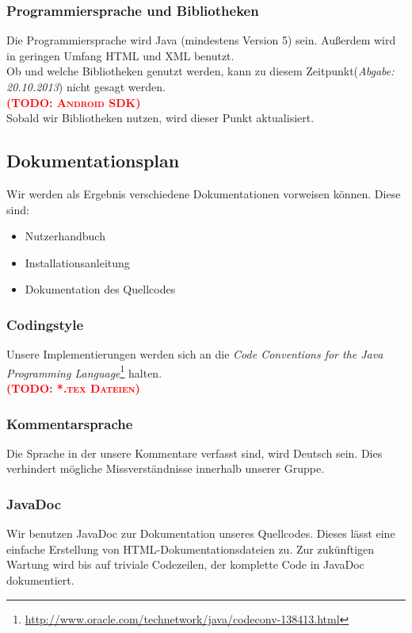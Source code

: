\documentclass[fontsize=12pt,paper=a4,twoside]{scrartcl}
\newcommand{\todo}[1]{\textbf{\textsc{\textcolor{red}{(TODO: #1)}}}}
\begin{document}
\subsubsection{Programmiersprache und Bibliotheken}
Die Programmiersprache wird Java  (mindestens Version 5) sein. Außerdem wird in geringen Umfang HTML und XML benutzt.\\
Ob und welche Bibliotheken genutzt werden, kann zu diesem Zeitpunkt(\emph{Abgabe: 20.10.2013}) nicht gesagt werden.\\
\todo{Android SDK}
\\
Sobald wir Bibliotheken nutzen, wird dieser Punkt aktualisiert.
\subsection{Dokumentationsplan}
Wir werden als Ergebnis verschiedene Dokumentationen vorweisen können. Diese sind:

\begin{itemize}
\item{Nutzerhandbuch}
\item{Installationsanleitung}
\item{Dokumentation des Quellcodes}
\end{itemize}

\subsubsection{Codingstyle}
Unsere Implementierungen werden sich an die \emph{Code Conventions for the Java Programming Language}\footnote{\url{http://www.oracle.com/technetwork/java/codeconv-138413.html}} halten.\\
\todo{*.tex Dateien}

\subsubsection{Kommentarsprache}
Die Sprache in der unsere Kommentare verfasst sind, wird Deutsch sein. Dies verhindert mögliche Missverständnisse innerhalb unserer Gruppe.

\subsubsection{JavaDoc}
Wir benutzen JavaDoc zur Dokumentation unseres Quellcodes. Dieses lässt eine einfache Erstellung von HTML-Dokumentationsdateien zu.
Zur zukünftigen Wartung wird bis auf triviale Codezeilen, der komplette Code in JavaDoc dokumentiert.
\end{document}
